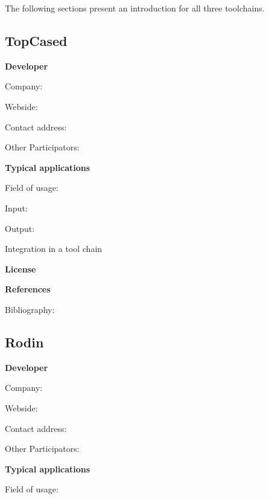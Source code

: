 The following sections present an introduction for all three toolchains.

\subsection{TopCased}

	\textbf{Developer}

	Company: 

	Webside:

	Contact address:

	Other  Participators:



	\textbf{Typical applications}

	Field of usage:


	Input:

	Output:





	Integration in a tool chain



	\textbf{License}


	\textbf{References}

	Bibliography:

\subsection{Rodin}

	\textbf{Developer}

	Company: 

	Webside:

	Contact address:

	Other  Participators:



	\textbf{Typical applications}

	Field of usage:

